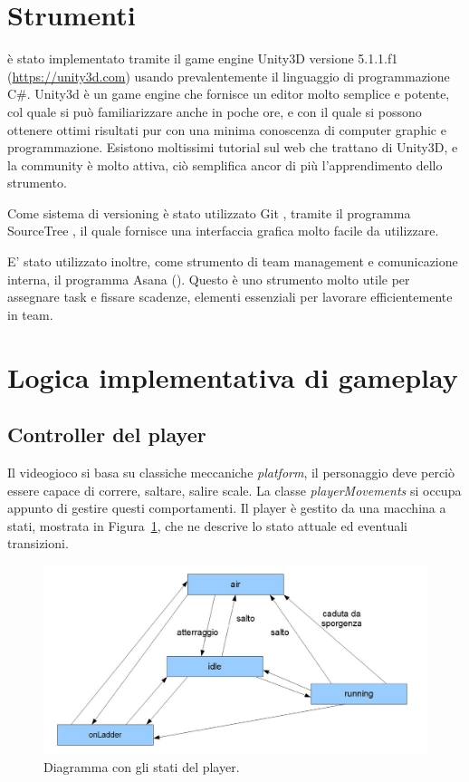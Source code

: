 \section{Strumenti}
\label{sec:dev_strumenti}

 è stato implementato tramite il game engine Unity3D versione 5.1.1.f1 (\url{https://unity3d.com}) usando prevalentemente il linguaggio di programmazione C\#. Unity3d è un game engine che fornisce un editor molto semplice e potente, col quale si può familiarizzare anche in poche ore, e con il quale si possono ottenere ottimi risultati pur con una minima conoscenza di computer graphic e programmazione. Esistono moltissimi tutorial sul web che trattano di Unity3D, e la community è molto attiva, ciò semplifica ancor di più l'apprendimento dello strumento.

Come sistema di versioning è stato utilizzato Git \cite{github}, tramite il programma SourceTree \cite{sourcetree}, il quale fornisce una interfaccia grafica molto facile da utilizzare.

E' stato utilizzato inoltre, come strumento di team management e comunicazione interna, il programma Asana (\cite{asana}). Questo è uno strumento molto utile per assegnare task e fissare scadenze, elementi essenziali per lavorare efficientemente in team.

\section{Logica implementativa di gameplay}

\subsection{Controller del player}
\label{sec:player_movements}

Il videogioco si basa su classiche meccaniche \textit{platform}, il personaggio deve perciò essere capace di correre, saltare, salire scale. La classe \textit{playerMovements} si occupa appunto di gestire questi comportamenti.
Il player è gestito da una macchina a stati, mostrata in Figura~\ref{fig:development_player_stati}, che ne descrive lo stato attuale ed eventuali transizioni.

\begin{figure}%
	\centering
	\includegraphics[width= 0.9\columnwidth]{images/development/player.jpg}
	\caption{Diagramma con gli stati del player.}
	\label{fig:development_player_stati}
\end{figure}

